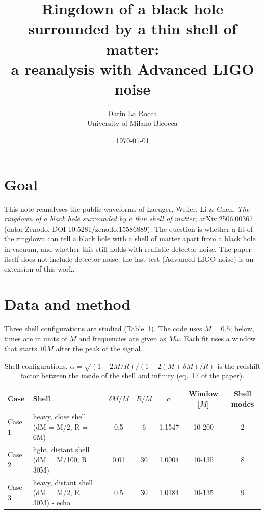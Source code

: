 \documentclass[11pt,a4paper]{article}
\title{Ringdown of a black hole surrounded by a thin shell of matter:\\ a reanalysis with Advanced LIGO noise}
\author{Darin La Rocca\\ \small University of Milano-Bicocca}
\date{\today}
\begin{document}
\maketitle

\section{Goal}
This note reanalyses the public waveforms of Laeuger, Weller, Li \& Chen, \emph{The ringdown of a black hole
surrounded by a thin shell of matter}, arXiv:2506.00367 (data: Zenodo, DOI 10.5281/zenodo.15586889).
The question is whether a fit of the ringdown can tell a black hole with a shell of matter apart from a
black hole in vacuum, and whether this still holds with realistic detector noise. The paper itself does not
include detector noise; the last test (Advanced LIGO noise) is an extension of this work.

\section{Data and method}
Three shell configurations are studied (Table~\ref{tab:cases}). The code uses $M=0.5$; below, times are in
units of $M$ and frequencies are given as $M\omega$. Each fit uses a window that starts $10M$ after the peak
of the signal.

\begin{table}[H]
\centering\footnotesize
\begin{tabular}{llccccc}
\toprule
Case & Shell & $\delta M/M$ & $R/M$ & $\alpha$ & Window [$M$] & Shell modes \\
\midrule
Case 1 & heavy, close shell (dM = M/2, R = 6M) & 0.5 & 6 & 1.1547 & 10-200 & 2 \\
Case 2 & light, distant shell (dM = M/100, R = 30M) & 0.01 & 30 & 1.0004 & 10-135 & 8 \\
Case 3 & heavy, distant shell (dM = M/2, R = 30M) - echo & 0.5 & 30 & 1.0184 & 10-135 & 9 \\
\bottomrule
\end{tabular}
\caption{Shell configurations. $\alpha=\sqrt{(1-2M/R)/(1-2(M+\delta M)/R)}$ is the redshift factor between the inside of the shell and infinity (eq.~17 of the paper).\label{tab:cases}}
\end{table}
\end{document}
